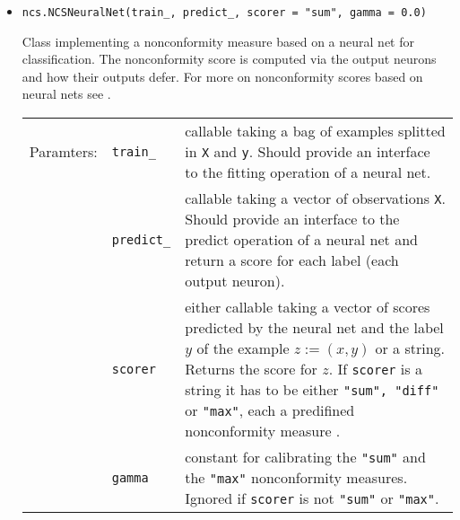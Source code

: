 \documentclass[twoside,11pt]{article}
\def\wo{~\\}
\begin{document}
\begin{appendices}
\begin{itemize}

        \item
          \texttt{ncs.NCSNeuralNet(train\_, predict\_,
            scorer = "sum", gamma = 0.0)}

          Class implementing a nonconformity measure based
          on a neural net for classification.
          The nonconformity score is computed via the
          output neurons and how their outputs defer.
          For more on nonconformity scores based on neural
          nets see \citet[Chapter 4]
          {papadopoulos_et_al_2007,alrw}.
          \\

          \begin{tabu}{llX}
            Paramters: &\texttt{train\_}
                       &callable taking a bag of examples
                        splitted in \texttt{X} and
                        \texttt{y}. Should provide an
                        interface to the fitting operation
                        of a neural net.
                        \\
                       &\texttt{predict\_}
                       &callable taking a vector of
                        observations \texttt{X}. Should
                        provide an interface to the
                        predict operation of a neural net
                        and return a score for each label
                        (each output neuron).
                        \\
                       &\texttt{scorer}
                       &either callable taking a vector of
                        scores predicted by the neural
                        net and the label $y$ of the
                        example $z := (x,y)$ or a string.
                        Returns the score for $z$.
                        If \texttt{scorer} is a string it
                        has to be either \texttt{"sum",
                        "diff"} or \texttt{"max"}, each a
                        predifined nonconformity measure
                        \citep[see][Chapter 4]
                        {papadopoulos_et_al_2007,alrw}.
                        \\
                       &\texttt{gamma}
                       &constant for calibrating the
                        \texttt{"sum"} and the
                        \texttt{"max"} nonconformity
                        measures.
                        Ignored if \texttt{scorer} is not
                        \texttt{"sum"} or \texttt{"max"}.
                        \\
          \end{tabu}
          \wo


\end{itemize}
\end{appendices}
\end{document}
